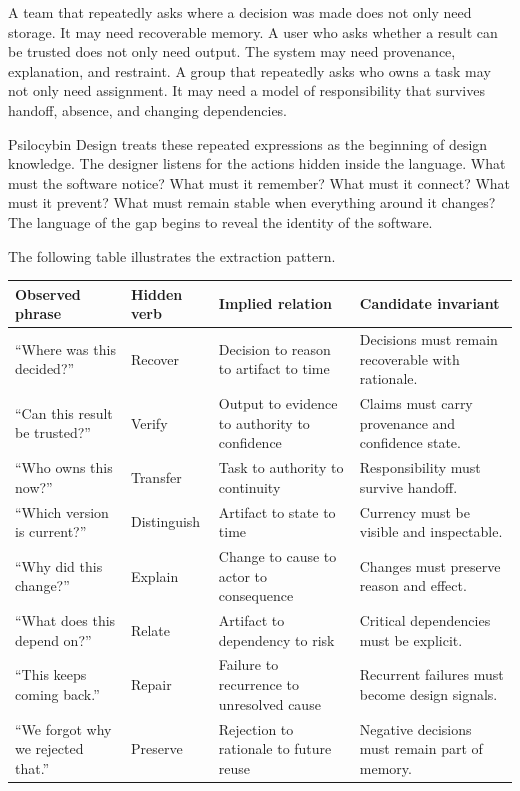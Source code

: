 \documentclass[11pt]{article}
\begin{document}
A team that repeatedly asks where a decision was made does not only need storage. It may need recoverable memory. A user who asks whether a result can be trusted does not only need output. The system may need provenance, explanation, and restraint. A group that repeatedly asks who owns a task may not only need assignment. It may need a model of responsibility that survives handoff, absence, and changing dependencies.

Psilocybin Design treats these repeated expressions as the beginning of design knowledge. The designer listens for the actions hidden inside the language. What must the software notice? What must it remember? What must it connect? What must it prevent? What must remain stable when everything around it changes? The language of the gap begins to reveal the identity of the software.

The following table illustrates the extraction pattern.

\begin{longtable}{|p{}|p{}|p{}|p{}|}
\hline
\textbf{Observed phrase} & \textbf{Hidden verb} & \textbf{Implied relation} & \textbf{Candidate invariant} \\
\hline
``Where was this decided?'' & Recover & Decision to reason to artifact to time & Decisions must remain recoverable with rationale. \\
\hline
``Can this result be trusted?'' & Verify & Output to evidence to authority to confidence & Claims must carry provenance and confidence state. \\
\hline
``Who owns this now?'' & Transfer & Task to authority to continuity & Responsibility must survive handoff. \\
\hline
``Which version is current?'' & Distinguish & Artifact to state to time & Currency must be visible and inspectable. \\
\hline
``Why did this change?'' & Explain & Change to cause to actor to consequence & Changes must preserve reason and effect. \\
\hline
``What does this depend on?'' & Relate & Artifact to dependency to risk & Critical dependencies must be explicit. \\
\hline
``This keeps coming back.'' & Repair & Failure to recurrence to unresolved cause & Recurrent failures must become design signals. \\
\hline
``We forgot why we rejected that.'' & Preserve & Rejection to rationale to future reuse & Negative decisions must remain part of memory. \\
\hline
\end{longtable}
\end{document}
